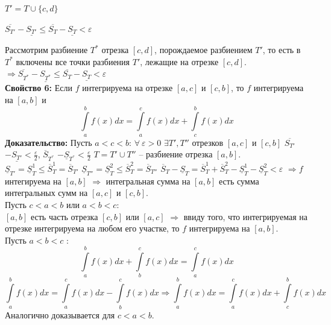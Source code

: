 \documentclass[a4paper,12pt]{article} %
\renewcommand {\leq}{\leqslant}
\begin{document}
	$T' = T \cup \{c,d\}$
	
	$\overline{S_{T'}}-\underline{S_{T'}}\leq \overline{S_T}-\underline{S_T} < \varepsilon$
	
	Рассмотрим разбиение $T^*$ отрезка $[c, d]$, порождаемое разбиением $T'$, то есть в $T^*$ включены все точки разбиения $T'$, лежащие на отрезке $[c, d]$.  $\Rightarrow \overline{S_{T^*}}- \underline{S_{T^*}}\leq  \overline{S_T}-\underline{S_T} < \varepsilon$\\
	\textbf{Свойство 6:}
	Если $ f $ интегрируема на отрезке $ [a, c]  $ и $ [c, b]  $, то $ f $ интегрируема на $ [a, b]  $ и \vspace*{1mm} \hspace*{50mm} $$\int\limits_a^b f(x)dx = \int\limits_a^c f(x)dx + \int\limits_c^b f(x)dx $$
	\textbf{Доказательство:}
	Пусть $ a < c < b$: $ \forall ~ \varepsilon > 0$ \hspace*{1mm}  $\exists T', T'' $ отрезков $ [a, c] $ и $ [c, b]  $ \hspace*{1mm}  $\overline{S_{T'}}$ $ - {\underline{S_{T'}}}  < \frac{\varepsilon}{2} $, \hspace*{2mm}  
	\vspace*{1mm}
	$\overline {S}_{T^{''}}$ $ - {\underline{S}_{T^{''}}}  <  {\frac{\varepsilon}{2}} $
	$T = T' \cup T{''}$ -- разбиение отрезка $ [a,b] $.
	$ \underline{S}_{T'} =  \underline{S}_{T}^1 \leq \overline{S}_{T}^1 = \overline{S}_{T'} $
	$ \underline{S}_{T''} =  \underline{S}_{T}^2 \leq \overline{S}_{T}^2 = \overline{S}_{T''} $
	$ \overline{S}_{T} -  \underline{S}_{T} = \overline{S}_{T}^1 + \overline{S}_{T}^2 - \underline{S}_{T}^1 - \underline{S}_{T}^2 < \varepsilon $ $ \Rightarrow f $ интегируема на $ [a, b]$ $ \Rightarrow $ интегральная сумма на $ [a, b] $ есть сумма интегральных сумм на $ [a,c] $ и $ [c, b] $.\\
	Пусть $ c < a < b $ или $ a < b < c $: \\[2 mm]
	$ [a, b] $ есть часть отрезка $ [c, b] $ или $ [a, c] $ $ \Rightarrow $ ввиду того, что интегрируемая на отрезке интегрируема на любом его участке, то $ f $ интегрируема на $ [a, b] $. \\
	Пусть $ a < b < c $ : \\[2 mm]
	$$\int\limits_a^b f(x)dx + \int\limits_b^c f(x)dx = \int\limits_a^c f(x)dx$$
	$$\int\limits_a^b f(x)dx = \int\limits_a^c f(x)dx - \int\limits_b^c f(x)dx  \Rightarrow \int\limits_a^b f(x)dx = \int\limits_a^c f(x)dx + \int\limits_c^b f(x)dx $$
	Аналогично доказывается для $ c < a < b$. \\ [2mm]
\end{document}
